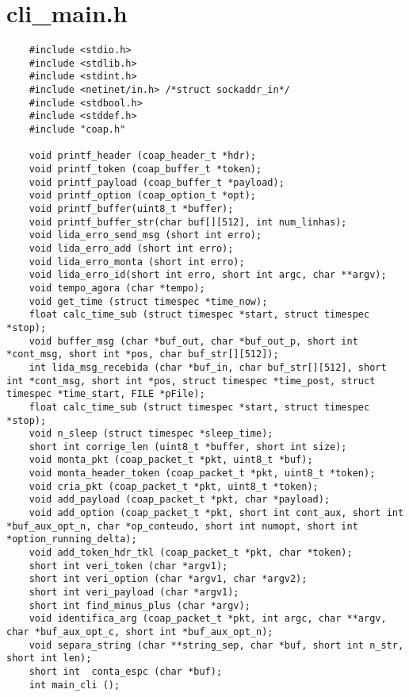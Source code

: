\tocless\section{cli\_main.h}

\begin{lstlisting}
	#include <stdio.h>
	#include <stdlib.h>
	#include <stdint.h>
	#include <netinet/in.h> /*struct sockaddr_in*/
	#include <stdbool.h>
	#include <stddef.h>
	#include "coap.h"
	
	void printf_header (coap_header_t *hdr);
	void printf_token (coap_buffer_t *token);
	void printf_payload (coap_buffer_t *payload);
	void printf_option (coap_option_t *opt);
	void printf_buffer(uint8_t *buffer);
	void printf_buffer_str(char buf[][512], int num_linhas);
	void lida_erro_send_msg (short int erro);
	void lida_erro_add (short int erro);
	void lida_erro_monta (short int erro);
	void lida_erro_id(short int erro, short int argc, char **argv);
	void tempo_agora (char *tempo);
	void get_time (struct timespec *time_now);
	float calc_time_sub (struct timespec *start, struct timespec *stop);
	void buffer_msg (char *buf_out, char *buf_out_p, short int *cont_msg, short int *pos, char buf_str[][512]);
	int lida_msg_recebida (char *buf_in, char buf_str[][512], short int *cont_msg, short int *pos, struct timespec *time_post, struct timespec *time_start, FILE *pFile);
	float calc_time_sub (struct timespec *start, struct timespec *stop);
	void n_sleep (struct timespec *sleep_time);
	short int corrige_len (uint8_t *buffer, short int size);
	void monta_pkt (coap_packet_t *pkt, uint8_t *buf);
	void monta_header_token (coap_packet_t *pkt, uint8_t *token);
	void cria_pkt (coap_packet_t *pkt, uint8_t *token);
	void add_payload (coap_packet_t *pkt, char *payload);
	void add_option (coap_packet_t *pkt, short int cont_aux, short int *buf_aux_opt_n, char *op_conteudo, short int numopt, short int *option_running_delta);
	void add_token_hdr_tkl (coap_packet_t *pkt, char *token);
	short int veri_token (char *argv1);
	short int veri_option (char *argv1, char *argv2);
	short int veri_payload (char *argv1);
	short int find_minus_plus (char *argv);
	void identifica_arg (coap_packet_t *pkt, int argc, char **argv, char *buf_aux_opt_c, short int *buf_aux_opt_n);
	void separa_string (char **string_sep, char *buf, short int n_str, short int len);
	short int  conta_espc (char *buf);
	int main_cli ();
\end{lstlisting}
